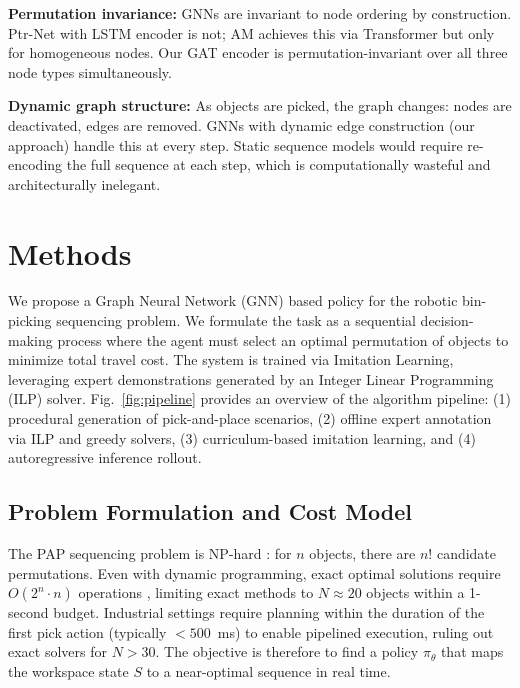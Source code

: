 \documentclass[conference]{IEEEtran}
\begin{document}
\textbf{Permutation invariance:} GNNs are invariant to node ordering by construction. Ptr-Net with LSTM encoder is not; AM achieves this via Transformer but only for homogeneous nodes. Our GAT encoder is permutation-invariant over all three node types simultaneously.

\textbf{Dynamic graph structure:} As objects are picked, the graph changes: nodes are deactivated, edges are removed. GNNs with dynamic edge construction (our approach) handle this at every step. Static sequence models would require re-encoding the full sequence at each step, which is computationally wasteful and architecturally inelegant.

\section{Methods}\label{sec:methods}

We propose a Graph Neural Network (GNN) based policy for the robotic bin-picking sequencing problem. We formulate the task as a sequential decision-making process where the agent must select an optimal permutation of objects to minimize total travel cost. The system is trained via Imitation Learning, leveraging expert demonstrations generated by an Integer Linear Programming (ILP) solver. Fig.~\ref{fig:pipeline} provides an overview of the algorithm pipeline: (1) procedural generation of pick-and-place scenarios, (2) offline expert annotation via ILP and greedy solvers, (3) curriculum-based imitation learning, and (4) autoregressive inference rollout.

\subsection{Problem Formulation and Cost Model}

The PAP sequencing problem is NP-hard \cite{chalasani1996}: for $n$ objects, there are $n!$ candidate permutations. Even with dynamic programming, exact optimal solutions require $O(2^n \cdot n)$ operations \cite{han2019pap}, limiting exact methods to $N \approx 20$ objects within a 1-second budget. Industrial settings require planning within the duration of the first pick action (typically $<500$~ms) to enable pipelined execution, ruling out exact solvers for $N > 30$. The objective is therefore to find a policy $\pi_\theta$ that maps the workspace state $S$ to a near-optimal sequence in real time.
\end{document}
